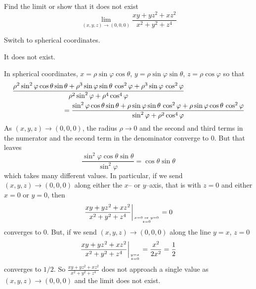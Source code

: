\begin{question}[M253 2010D] %
Find the limit or show that it does not exist
\begin{equation*}
\lim_{(x,y,z)\to(0,0,0)}\frac{xy+yz^2+xz^2}{x^2+y^2+z^4}
\end{equation*}

\end{question}

\begin{hint}
Switch to spherical coordinates.
\end{hint}

\begin{answer}
It does not exist.
\end{answer}

\begin{solution}
In spherical coordinates, $x=\rho\sin\varphi\cos\theta$, 
$y=\rho\sin\varphi\sin\theta$, $z=\rho\cos\varphi$ so that 
\begin{align*}
&\frac{\rho^2\sin^2\varphi\cos\theta\sin\theta
      +\rho^3\sin\varphi\sin\theta\,\cos^2\varphi
      +\rho^3\sin\varphi\,\cos^2\varphi}
     {\rho^2\sin^2\varphi+\rho^4\cos^4\varphi} \\
&\hskip1in 
=\frac{\sin^2\varphi\cos\theta\sin\theta
      +\rho\sin\varphi\sin\theta\,\cos^2\varphi
      +\rho\sin\varphi\cos\theta\,\cos^2\varphi}
     {\sin^2\varphi+\rho^2\cos^4\varphi}
\end{align*}
As $(x,y,z)\to (0,0,0)$, the radius $\rho\to 0$ and the second and third terms 
in the numerator and the second term in the denominator converge to $0$.
But that leaves
\begin{equation*}
\frac{\sin^2\varphi\cos\theta\sin\theta}{\sin^2\varphi}
=\cos\theta\sin\theta
\end{equation*}
which takes many different values. In particular, if we send 
$(x,y,z)\to (0,0,0)$ along either the $x$-- or $y$--axis,
that is with $z=0$ and either $x=0$ or $y=0$, then
\begin{equation*}
\frac{xy+yz^2+xz^2}{x^2+y^2+z^4}\bigg|_{\Atop{x=0\text{ or }y=0}{z=0}}=0
\end{equation*}
converges to $0$. But, if we send 
$(x,y,z)\to (0,0,0)$ along the line $y=x$, $z=0$
\begin{equation*}
\frac{xy+yz^2+xz^2}{x^2+y^2+z^4}\bigg|_{\Atop{y=x}{z=0}}=\frac{x^2}{2x^2}
=\frac{1}{2}
\end{equation*}
converges to $1/2$. So $\frac{xy+yz^2+xz^2}{x^2+y^2+z^4}$ does not 
approach a single value as  $(x,y,z)\to(0,0,0)$ and the limit does not exist.
\end{solution}

